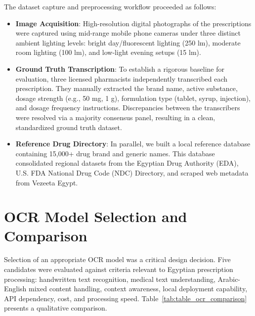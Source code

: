 \documentclass[12pt,a4paper,oneside]{report}
\begin{document}
The dataset capture and preprocessing workflow proceeded as follows:

\begin{itemize}
\item
  \textbf{Image Acquisition}: High-resolution digital photographs of the
  prescriptions were captured using mid-range mobile phone cameras under
  three distinct ambient lighting levels: bright day/fluorescent
  lighting (250 lm), moderate room lighting (100 lm), and low-light
  evening setups (15 lm).
\item
  \textbf{Ground Truth Transcription}: To establish a rigorous baseline
  for evaluation, three licensed pharmacists independently transcribed
  each prescription. They manually extracted the brand name, active
  substance, dosage strength (e.g., 50 mg, 1 g), formulation type
  (tablet, syrup, injection), and dosage frequency instructions.
  Discrepancies between the transcribers were resolved via a majority
  consensus panel, resulting in a clean, standardized ground truth
  dataset.
\item
  \textbf{Reference Drug Directory}: In parallel, we built a local
  reference database containing 15,000+ drug brand and generic names.
  This database consolidated regional datasets from the Egyptian Drug
  Authority (EDA), U.S. FDA National Drug Code (NDC) Directory, and
  scraped web metadata from Vezeeta Egypt.
\end{itemize}

\section{OCR Model Selection and Comparison}\label{ocr-model-selection-and-comparison}

Selection of an appropriate OCR model was a critical design decision. Five candidates were evaluated against criteria relevant to Egyptian prescription processing: handwritten text recognition, medical text understanding, Arabic-English mixed content handling, context awareness, local deployment capability, API dependency, cost, and processing speed. Table~\ref{tab:table_ocr_comparison} presents a qualitative comparison.
\end{document}
